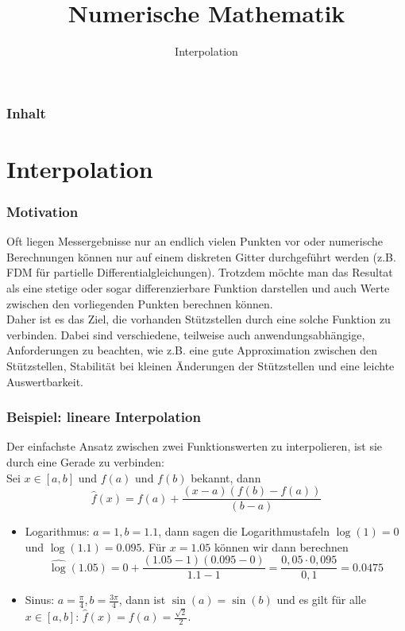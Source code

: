 
\usepackage[all,cmtip]{xy}
\title{Numerische Mathematik}
\subtitle{Interpolation}



\makeTitlePage

\begin{frame}\frametitle{Inhalt}
   \tableofcontents
\end{frame}
%

%

\section{Interpolation}
\makeSectionDividerPage
\begin{frame}\frametitle{Motivation}
Oft liegen Messergebnisse nur an endlich vielen Punkten vor oder numerische Berechnungen können nur auf einem diskreten Gitter durchgeführt werden (z.B. FDM für partielle Differentialgleichungen). Trotzdem möchte man das Resultat als eine stetige oder sogar differenzierbare Funktion darstellen und auch Werte zwischen den vorliegenden Punkten berechnen können.\\\pause\vfill
Daher ist es das Ziel, die vorhanden Stützstellen durch eine solche Funktion zu verbinden. Dabei sind verschiedene, teilweise auch anwendungsabhängige, Anforderungen zu beachten, wie z.B. eine gute Approximation zwischen den Stützstellen, Stabilität bei kleinen Änderungen der Stützstellen und eine leichte Auswertbarkeit.  
\end{frame}
%
\begin{frame}\frametitle{Beispiel: lineare Interpolation}
Der einfachste Ansatz zwischen zwei Funktionswerten zu interpolieren, ist sie durch eine Gerade zu verbinden:\\
Sei $x \in [a,b]$ und $f(a)$ und $f(b)$ bekannt, dann
$$
\hat f(x)=f(a)+\frac{(x-a)(f(b)-f(a))}{(b-a)}
$$
\begin{itemize}\pause
\item Logarithmus: $a=1, b=1.1$, dann sagen die Logarithmustafeln $\log(1)=0$ und $\log(1.1)=0.095$. Für $x=1.05$ können wir dann berechnen
$$
\widehat \log(1.05)=0+\frac{(1.05-1)(0.095-0)}{1.1-1}=\frac{0,05\cdot 0,095}{0,1}=0.0475
$$\pause
\item Sinus: $a=\frac{\pi}{4}, b=\frac{3\pi}{4}$, dann ist $\sin(a)=\sin(b)$ und es gilt für alle $x\in [a,b]$: $\hat f(x)=f(a)= \frac{\sqrt{2}}{2}$.

\end{itemize}
\end{frame}
%
